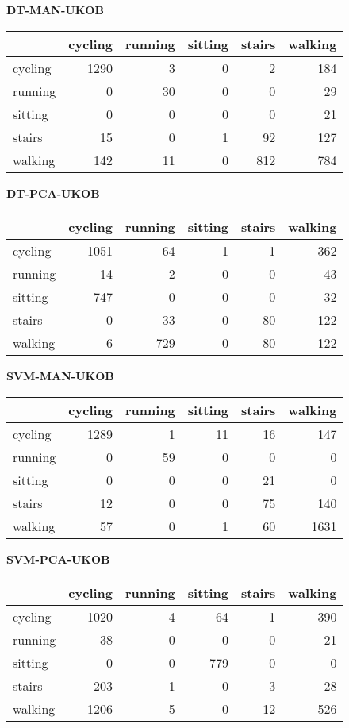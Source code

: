 {\bf DT-MAN-UKOB}
\begin{center}
\begin{tabular}{|l|rrrrr|} \hline
 & cycling & running & sitting & stairs & walking\\
\hline
cycling & 1290 & 3 & 0 & 2 & 184\\
running & 0 & 30 & 0 & 0 & 29\\
sitting & 0 & 0 & 0 & 0 & 21\\
stairs & 15 & 0 & 1 & 92 & 127\\
walking & 142 & 11 & 0 & 812 & 784\\
\hline
\end{tabular}
\end{center}

{\bf DT-PCA-UKOB}
\begin{center}
\begin{tabular}{|l|rrrrr|} \hline
 & cycling & running & sitting & stairs & walking\\
\hline
cycling & 1051 & 64 & 1 & 1 & 362\\
running & 14 & 2 & 0 & 0 & 43\\
sitting & 747 & 0 & 0 & 0 & 32\\
stairs & 0 & 33 & 0 & 80 & 122\\
walking & 6 & 729 & 0 & 80 & 122\\
\hline
\end{tabular}
\end{center}

{\bf SVM-MAN-UKOB}
\begin{center}
\begin{tabular}{|l|rrrrr|} \hline
 & cycling & running & sitting & stairs & walking\\
\hline
cycling & 1289 & 1 & 11 & 16 & 147\\
running & 0 & 59 & 0 & 0 & 0\\
sitting & 0 & 0 & 0 & 21 & 0\\
stairs & 12 & 0 & 0 & 75 & 140\\
walking & 57 & 0 & 1 & 60 & 1631\\
\hline
\end{tabular}
\end{center}

{\bf SVM-PCA-UKOB}
\begin{center}
\begin{tabular}{|l|rrrrr|} \hline
 & cycling & running & sitting & stairs & walking\\
\hline
cycling & 1020 & 4 & 64 & 1 & 390\\
running & 38 & 0 & 0 & 0 & 21\\
sitting & 0 & 0 & 779 & 0 & 0\\
stairs & 203 & 1 & 0 & 3 & 28\\
walking & 1206 & 5 & 0 & 12 & 526\\
\hline
\end{tabular}
\end{center}

